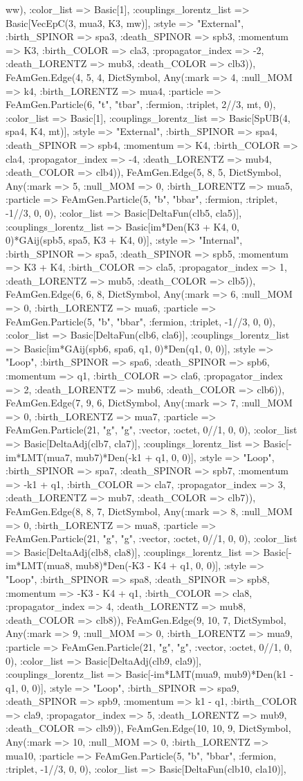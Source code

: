\documentclass{revtex4}
\begin{document}
\begin{figure}[!htb]
\begin{center}
{ww), :color_list => Basic[1], :couplings_lorentz_list => Basic[VecEpC(3, mua3, K3, mw)], :style => "External", :birth_SPINOR => spa3, :death_SPINOR => spb3, :momentum => K3, :birth_COLOR => cla3, :propagator_index => -2, :death_LORENTZ => mub3, :death_COLOR => clb3)), FeAmGen.Edge(4, 5, 4, Dict{Symbol, Any}(:mark => 4, :null_MOM => k4, :birth_LORENTZ => mua4, :particle => FeAmGen.Particle(6, "t", "tbar", :fermion, :triplet, 2//3, mt, 0), :color_list => Basic[1], :couplings_lorentz_list => Basic[SpUB(4, spa4, K4, mt)], :style => "External", :birth_SPINOR => spa4, :death_SPINOR => spb4, :momentum => K4, :birth_COLOR => cla4, :propagator_index => -4, :death_LORENTZ => mub4, :death_COLOR => clb4)), FeAmGen.Edge(5, 8, 5, Dict{Symbol, Any}(:mark => 5, :null_MOM => 0, :birth_LORENTZ => mua5, :particle => FeAmGen.Particle(5, "b", "bbar", :fermion, :triplet, -1//3, 0, 0), :color_list => Basic[DeltaFun(clb5, cla5)], :couplings_lorentz_list => Basic[im*Den(K3 + K4, 0, 0)*GAij(spb5, spa5, K3 + K4, 0)], :style => "Internal", :birth_SPINOR => spa5, :death_SPINOR => spb5, :momentum => K3 + K4, :birth_COLOR => cla5, :propagator_index => 1, :death_LORENTZ => mub5, :death_COLOR => clb5)), FeAmGen.Edge(6, 6, 8, Dict{Symbol, Any}(:mark => 6, :null_MOM => 0, :birth_LORENTZ => mua6, :particle => FeAmGen.Particle(5, "b", "bbar", :fermion, :triplet, -1//3, 0, 0), :color_list => Basic[DeltaFun(clb6, cla6)], :couplings_lorentz_list => Basic[im*GAij(spb6, spa6, q1, 0)*Den(q1, 0, 0)], :style => "Loop", :birth_SPINOR => spa6, :death_SPINOR => spb6, :momentum => q1, :birth_COLOR => cla6, :propagator_index => 2, :death_LORENTZ => mub6, :death_COLOR => clb6)), FeAmGen.Edge(7, 9, 6, Dict{Symbol, Any}(:mark => 7, :null_MOM => 0, :birth_LORENTZ => mua7, :particle => FeAmGen.Particle(21, "g", "g", :vector, :octet, 0//1, 0, 0), :color_list => Basic[DeltaAdj(clb7, cla7)], :couplings_lorentz_list => Basic[-im*LMT(mua7, mub7)*Den(-k1 + q1, 0, 0)], :style => "Loop", :birth_SPINOR => spa7, :death_SPINOR => spb7, :momentum => -k1 + q1, :birth_COLOR => cla7, :propagator_index => 3, :death_LORENTZ => mub7, :death_COLOR => clb7)), FeAmGen.Edge(8, 8, 7, Dict{Symbol, Any}(:mark => 8, :null_MOM => 0, :birth_LORENTZ => mua8, :particle => FeAmGen.Particle(21, "g", "g", :vector, :octet, 0//1, 0, 0), :color_list => Basic[DeltaAdj(clb8, cla8)], :couplings_lorentz_list => Basic[-im*LMT(mua8, mub8)*Den(-K3 - K4 + q1, 0, 0)], :style => "Loop", :birth_SPINOR => spa8, :death_SPINOR => spb8, :momentum => -K3 - K4 + q1, :birth_COLOR => cla8, :propagator_index => 4, :death_LORENTZ => mub8, :death_COLOR => clb8)), FeAmGen.Edge(9, 10, 7, Dict{Symbol, Any}(:mark => 9, :null_MOM => 0, :birth_LORENTZ => mua9, :particle => FeAmGen.Particle(21, "g", "g", :vector, :octet, 0//1, 0, 0), :color_list => Basic[DeltaAdj(clb9, cla9)], :couplings_lorentz_list => Basic[-im*LMT(mua9, mub9)*Den(k1 - q1, 0, 0)], :style => "Loop", :birth_SPINOR => spa9, :death_SPINOR => spb9, :momentum => k1 - q1, :birth_COLOR => cla9, :propagator_index => 5, :death_LORENTZ => mub9, :death_COLOR => clb9)), FeAmGen.Edge(10, 10, 9, Dict{Symbol, Any}(:mark => 10, :null_MOM => 0, :birth_LORENTZ => mua10, :particle => FeAmGen.Particle(5, "b", "bbar", :fermion, :triplet, -1//3, 0, 0), :color_list => Basic[DeltaFun(clb10, cla10)], }
\end{center}
\end{figure}
\end{document}
